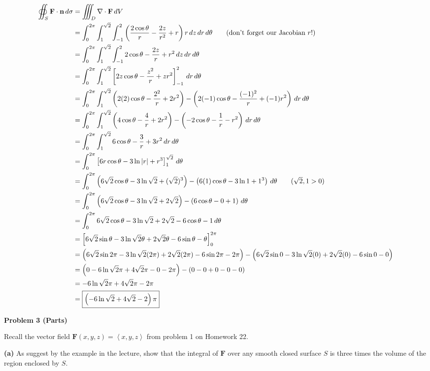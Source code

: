 \documentclass{article}
\newcommand{\lrp}[1]{\left( #1 \right)}
\newcommand{\lra}[1]{\left\langle #1 \right\rangle}
\newcommand{\lrb}[1]{\left[ #1 \right]}
\newcommand{\F}[0]{\mathbf{F}}
\newcommand{\n}[0]{{\mathbf{n}}}
\begin{document}
\begin{align*}
    \oiint_S \F\cdot \n \,d\sigma&=\iiint_D \nabla \cdot \F\,dV\\
    &=\int_0^{2\pi}\int_1^{\sqrt{2}}\int_{-1}^2 \lrp{\frac{2\cos\theta}{r}-\frac{2z}{r^2}+ r}r\,dz\,dr\,d\theta\tag{don't forget our Jacobian $r$!}\\
    &=\int_0^{2\pi}\int_1^{\sqrt{2}}\int_{-1}^2 2\cos\theta-\frac{2z}{r}+r^2\,dz\,dr\,d\theta\\
    &=\int_0^{2\pi}\int_1^{\sqrt{2}}\lrb{2z\cos\theta-\frac{z^2}{r}+zr^2}_{-1}^2\,dr\,d\theta\\
    &=\int_0^{2\pi}\int_1^{\sqrt{2}} \lrp{2(2)\cos\theta-\frac{2^2}{r}+2r^2}-\lrp{2(-1)\cos\theta-\frac{(-1)^2}{r}+(-1)r^2}\,dr\,d\theta\\
    &=\int_0^{2\pi}\int_1^{\sqrt{2}} \lrp{4\cos\theta-\frac{4}{r}+2r^2 }-\lrp{-2\cos\theta -\frac{1}{r}-r^2}\,dr\,d\theta\\
    &=\int_0^{2\pi}\int_1^{\sqrt{2}} 6\cos\theta - \frac{3}{r}+3r^2\,dr\,d\theta\\
    &=\int_0^{2\pi}\lrb{6r\cos\theta-3\ln \left|r\right| + r^3}_1^{\sqrt{2}}\,d\theta\\
    &=\int_0^{2\pi}\lrp{6\sqrt{2}\cos\theta-3\ln \sqrt{2}+ (\sqrt{2})^3}-\lrp{6(1)\cos\theta-3\ln 1 + 1^3}\,d\theta\tag{$\sqrt{2},1> 0$}\\
    &=\int_0^{2\pi}\lrp{6\sqrt{2}\cos\theta-3\ln\sqrt{2}+2\sqrt{2}}-\lrp{6\cos\theta-0+1}\,d\theta\\
    &=\int_0^{2\pi}6\sqrt{2}\cos\theta -3\ln \sqrt{2}+2\sqrt{2}-6\cos\theta-1\,d\theta\\
    &=\lrb{6\sqrt{2}\sin\theta-3\ln\sqrt{2}\theta+2\sqrt{2}\theta-6\sin\theta-\theta}_0^{2\pi}\\
    &=\lrp{6\sqrt{2}\sin 2\pi -3\ln \sqrt{2}(2\pi)+2\sqrt{2}(2\pi)-6\sin2\pi - 2\pi}-\lrp{6\sqrt{2}\sin 0 -3\ln \sqrt{2}(0)+2\sqrt{2}(0)-6\sin 0 - 0}\\
    &=\lrp{0-6\ln\sqrt{2}\pi + 4\sqrt{2}\pi - 0 - 2\pi}-\lrp{0-0+0-0-0}\\
    &=-6\ln\sqrt{2}\pi + 4\sqrt{2}\pi-2\pi\\
    &=\boxed{\lrp{-6\ln \sqrt{2}+4\sqrt{2}-2}\pi}
\end{align*}
{}\textbf{Problem 3 (Parts)}

Recall the vector field $\F(x,y,z)=\lra{x,y,z}$ from problem 1 on Homework 22.

{}\textbf{(a)} As suggest by the example in the lecture, show that the integral of $\F$ over any smooth closed surface $S$ is three times the volume of the region enclosed by $S$.
\end{document}
